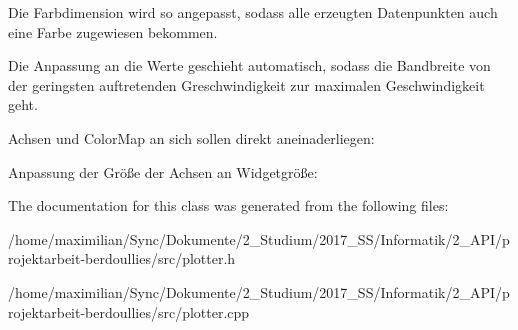 Die Farbdimension wird so angepasst, sodass alle erzeugten Datenpunkten auch eine Farbe zugewiesen bekommen.

Die Anpassung an die Werte geschieht automatisch, sodass die Bandbreite von der geringsten auftretenden Greschwindigkeit zur maximalen Geschwindigkeit geht.

Achsen und Color\+Map an sich sollen direkt aneinaderliegen\+:

Anpassung der Größe der Achsen an Widgetgröße\+: 

The documentation for this class was generated from the following files\+:\begin{DoxyCompactItemize}
\item 
/home/maximilian/\+Sync/\+Dokumente/2\+\_\+\+Studium/2017\+\_\+\+S\+S/\+Informatik/2\+\_\+\+A\+P\+I/projektarbeit-\/berdoullies/src/plotter.\+h\item 
/home/maximilian/\+Sync/\+Dokumente/2\+\_\+\+Studium/2017\+\_\+\+S\+S/\+Informatik/2\+\_\+\+A\+P\+I/projektarbeit-\/berdoullies/src/plotter.\+cpp\end{DoxyCompactItemize}
